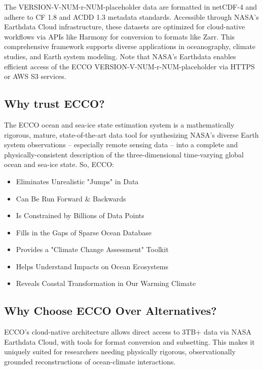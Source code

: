\par\vspace{0.25cm}
The VERSION-V-NUM-r-NUM-placeholder data are formatted in netCDF-4 and adhere to CF 1.8 and ACDD 1.3 metadata standards. Accessible through NASA's Earthdata Cloud infrastructure, these datasets are optimized for cloud-native workflows via APIs like Harmony for conversion to formats like Zarr. This comprehensive framework supports diverse applications in oceanography, climate studies, and Earth system modeling. Note that NASA's Earthdata enables efficient access of the ECCO VERSION-V-NUM-r-NUM-placeholder via HTTPS or AWS S3 services.

\subsection{Why trust ECCO?}
\par\vspace{0.25cm}
The ECCO ocean and sea-ice state estimation system is a mathematically rigorous, mature, state-of-the-art data tool for synthesizing NASA's diverse Earth system observations – especially remote sensing data – into a complete and physically-consistent description of the three-dimensional time-varying global ocean and sea-ice state.
\vspace{0.25cm}
So, ECCO:
\begin{itemize}
\item Eliminates Unrealistic "Jumps" in Data
\item Can Be Run Forward \& Backwards
\item Is Constrained by Billions of Data Points
\item Fills in the Gaps of Sparse Ocean Database
\item Provides a "Climate Change Assessment" Toolkit
\item Helps Understand Impacts on Ocean Ecosystems
\item Reveals Coastal Transformation in Our Warming Climate
\end{itemize}

\subsection{Why Choose ECCO Over Alternatives?}
\par\vspace{0.25cm}
ECCO's cloud-native architecture allows direct access to 3TB+ data via NASA Earthdata Cloud, with tools for format conversion and subsetting. This makes it uniquely suited for researchers needing physically rigorous, observationally grounded reconstructions of ocean-climate interactions.
\vspace{0.25cm}

